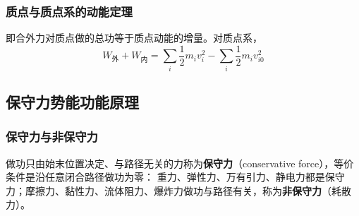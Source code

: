         \subsubsection{质点与质点系的动能定理}
        即合外力对质点做的总功等于质点动能的增量。对质点系，
        \[
        W_{\text{外}}+W_{\text{内}}=\sum_{i}\frac{1}{2}m_{i}v_{i}^{2}-\sum_{i}\frac{1}{2}m_{i}v_{i0}^{2}
        \]

    \subsection{保守力\texorpdfstring{\hspace{0.5em}}{ }势能\texorpdfstring{\hspace{0.5em}}{ }功能原理}
        \subsubsection{保守力与非保守力}
        做功只由始末位置决定、与路径无关的力称为\textbf{保守力}（conservative force），等价条件是沿任意闭合路径做功为零：
        重力、弹性力、万有引力、静电力都是保守力；摩擦力、黏性力、流体阻力、爆炸力做功与路径有关，称为\textbf{非保守力}（耗散力）。

